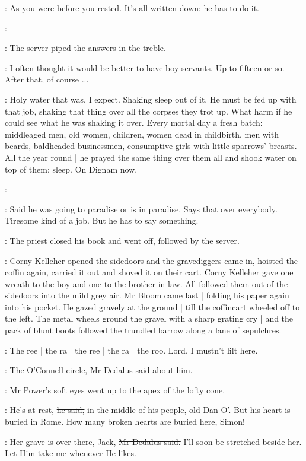 \BloomInt:
As you were before you rested.
It's all written down:
he has to do it.

\coffey:

:
The server piped the answers in the treble.

\BloomInt:
I often thought it would be better to have boy servants.
Up to fifteen or so.
After that, of course ...

\BloomInt:
Holy water that was, I expect.
Shaking sleep out of it.
He must be fed up with that job,
shaking that thing over all the corpses they trot up.
What harm if he could see what he was shaking it over.
Every mortal day a fresh batch:
middleaged men, old women, children,
women dead in childbirth,
men with beards, baldheaded businessmen,
consumptive girls with little sparrows' breasts.
All the year round |
he prayed the same thing over them all and shook water on top of them:
sleep.
On Dignam now.

\coffey:

\BloomInt:
Said he was going to paradise or is in paradise.
Says that over everybody.
Tiresome kind of a job.
But he has to say something.

:
The priest closed his book and went off, followed by the server.

:
Corny Kelleher opened the sidedoors and the gravediggers came in,
hoisted the coffin again, carried it out and shoved it on their cart.
Corny Kelleher gave one wreath to the boy and one to the brother-in-law.
All followed them out of the sidedoors into the mild grey air.
Mr Bloom came last |
folding his paper again into his pocket.
He gazed gravely at the ground |
till the coffincart wheeled off to the left.
The metal wheels ground the gravel
with a sharp grating cry |
and the pack of blunt boots followed the trundled barrow
along a lane of sepulchres.

\BloomInt:
The ree |
the ra |
the ree |
the ra |
the roo.
Lord, I mustn't lilt here.

\simon:
The O'Connell circle,
\sout{Mr Dedalus said about him.}

:
Mr Power's soft eyes went up to the apex of the lofty cone.

\power:
He's at rest,
\sout{he said,}
in the middle of his people, old Dan O'.
But his heart is buried in Rome.
How many broken hearts are buried here, Simon!

\simon:
Her grave is over there, Jack,
\sout{Mr Dedalus said.}
I'll soon be stretched beside her.
Let Him take me whenever He likes.

